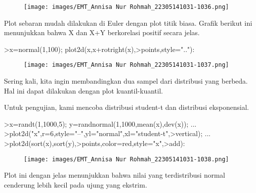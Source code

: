 \documentclass[a4paper,10pt]{article}
\begin{document}
\begin{eulernotebook}
\begin{eulercomment}
\begin{eulercomment}
\begin{eulercomment}
\begin{eulercomment}
\begin{figure}[h]
    \centering
    \texttt{[image: images/EMT\_Annisa Nur Rohmah\_22305141031-1036.png]}
\end{figure}
\begin{eulercomment}
Plot sebaran mudah dilakukan di Euler dengan plot titik biasa. Grafik
berikut ini menunjukkan bahwa X dan X+Y berkorelasi positif secara
jelas.
\end{eulercomment}
\begin{eulerprompt}
>x=normal(1,100); plot2d(x,x+rotright(x),>points,style=".."):
\end{eulerprompt}
\begin{figure}[h]
    \centering
    \texttt{[image: images/EMT\_Annisa Nur Rohmah\_22305141031-1037.png]}
\end{figure}
\begin{eulercomment}
Sering kali, kita ingin membandingkan dua sampel dari distribusi yang
berbeda. Hal ini dapat dilakukan dengan plot kuantil-kuantil.

Untuk pengujian, kami mencoba distribusi student-t dan distribusi
eksponensial.
\end{eulercomment}
\begin{eulerprompt}
>x=randt(1,1000,5); y=randnormal(1,1000,mean(x),dev(x)); ...
>plot2d("x",r=6,style="--",yl="normal",xl="student-t",>vertical); ...
>plot2d(sort(x),sort(y),>points,color=red,style="x",>add):
\end{eulerprompt}
\begin{figure}[h]
    \centering
    \texttt{[image: images/EMT\_Annisa Nur Rohmah\_22305141031-1038.png]}
\end{figure}
\begin{eulercomment}
Plot ini dengan jelas menunjukkan bahwa nilai yang terdistribusi
normal cenderung lebih kecil pada ujung yang ekstrim.


\end{eulercomment}
\end{eulercomment}
\end{eulercomment}
\end{eulercomment}
\end{eulercomment}
\end{eulernotebook}
\end{document}
